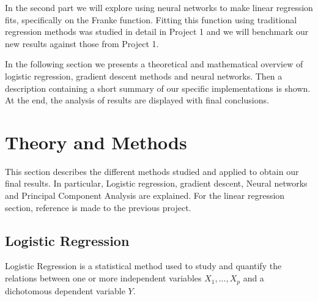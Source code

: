 \documentclass{emulateapj}
\begin{document}
In the second part we will explore using neural networks to make linear regression fits, specifically on the Franke function. Fitting this function using traditional regression methods was studied in detail in Project 1 and we will benchmark our new results against those from Project 1.

In the following section we presents a theoretical and mathematical overview of logistic regression, gradient descent methods and neural networks. Then a description  containing a short summary of our specific implementations is shown. At the end, the analysis of results are displayed with final conclusions.


\section{Theory and Methods}
\label{sec:theory_methods}
This section describes the different methods studied and applied to obtain our final results.
In particular, Logistic regression, gradient descent, Neural networks and Principal Component Analysis are explained.
For the linear regression section, reference is made to the previous project.
\subsection{Logistic Regression} \label{logistic}
Logistic Regression is a statistical method used to study and quantify the relations between one or more independent variables $X_1, ..., X_p$ and a dichotomous dependent variable $Y$.
\end{document}
